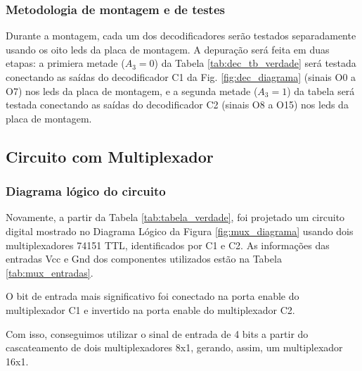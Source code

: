 \documentclass[a4,12pt]{horizon-theme}
\begin{document}
\newpage
\subsubsection{Metodologia de montagem e de testes}
\label{sec:dec_montagem}

Durante a montagem, cada um dos decodificadores serão testados separadamente usando os oito leds da placa de montagem. A depuração será feita em duas etapas: a primiera metade ($A_3 = 0$) da Tabela \ref{tab:dec_tb_verdade} será testada conectando as saídas do decodificador C1 da Fig. \ref{fig:dec_diagrama} (sinais O0 a O7) nos leds da placa de montagem, e a segunda metade ($A_3 = 1$) da tabela será testada conectando as saídas do decodificador C2 (sinais O8 a O15) nos leds da placa de montagem.


\subsection{Circuito com Multiplexador} %
\label{sec:mux}

\subsubsection{Diagrama lógico do circuito}
\label{sec:mux_diagrama}

Novamente, a partir da Tabela \ref{tab:tabela_verdade}, foi projetado um circuito digital mostrado no Diagrama Lógico da Figura \ref{fig:mux_diagrama} usando dois multiplexadores 74151 TTL, identificados por C1 e C2. As informações das entradas Vcc e Gnd dos componentes utilizados estão na Tabela \ref{tab:mux_entradas}.

O bit de entrada mais significativo foi conectado na porta enable do multiplexador C1 e invertido na porta enable do multiplexador C2.

Com isso, conseguimos utilizar o sinal de entrada de 4 bits a partir do cascateamento de dois multiplexadores 8x1, gerando, assim, um multiplexador 16x1.

\newpage
\end{document}
